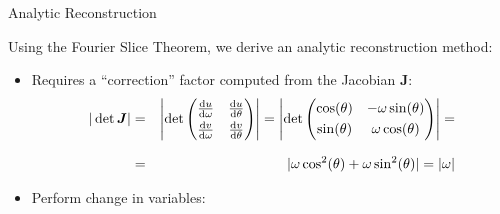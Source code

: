 \begin{frame}[c]{Analytic Reconstruction}

	Using the Fourier Slice Theorem, we derive an analytic reconstruction method:

	\hspace{0.8cm}
	\begin{itemize}
		\setlength\itemsep{0.8cm}

		\item<1-> Requires a ``correction'' factor computed from the Jacobian $\boldsymbol J$:
		      \begin{eqnarray}
			      |\det\boldsymbol J| &=&
			      \left|\det\begin{pmatrix}
				      \frac{\textnormal du}{\textnormal d\omega} & \frac{\textnormal du}{\textnormal d\theta}  \\[0.3em]
				      \frac{\textnormal dv}{\textnormal d\omega} & \frac{\textnormal dv}{\textnormal d \theta}
			      \end{pmatrix}\right| =
			      \left|\det\begin{pmatrix}
				      \cos(\theta) & -\omega \sin(\theta) \\[0.3em]
				      \sin(\theta) & \omega \cos(\theta)
			      \end{pmatrix}\right| =\\[0.75em]
			      &=&|\omega \cos^2(\theta) + \omega \sin^2(\theta)| = |\omega|
		      \end{eqnarray}

		\item<2-> Perform change in variables:


\end{itemize}
\end{frame}
